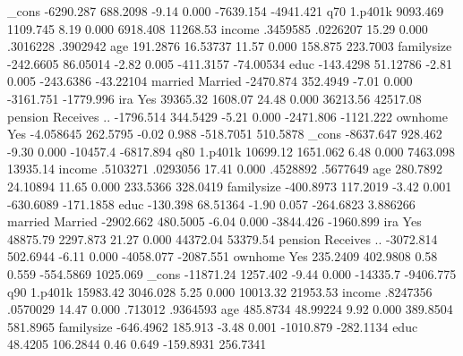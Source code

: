        _cons {\VBAR}  -6290.287   688.2098    -9.14   0.000    -7639.154   -4941.421
q70          {\VBAR}
     1.p401k {\VBAR}   9093.469   1109.745     8.19   0.000     6918.408    11268.53
      income {\VBAR}   .3459585   .0226207    15.29   0.000     .3016228    .3902942
         age {\VBAR}   191.2876   16.53737    11.57   0.000      158.875    223.7003
  familysize {\VBAR}  -242.6605   86.05014    -2.82   0.005    -411.3157   -74.00534
        educ {\VBAR}  -143.4298   51.12786    -2.81   0.005    -243.6386   -43.22104
             {\VBAR}
     married {\VBAR}
    Married  {\VBAR}  -2470.874   352.4949    -7.01   0.000    -3161.751   -1779.996
             {\VBAR}
         ira {\VBAR}
        Yes  {\VBAR}   39365.32    1608.07    24.48   0.000     36213.56    42517.08
             {\VBAR}
     pension {\VBAR}
Receives ..  {\VBAR}  -1796.514   344.5429    -5.21   0.000    -2471.806   -1121.222
             {\VBAR}
     ownhome {\VBAR}
        Yes  {\VBAR}  -4.058645   262.5795    -0.02   0.988    -518.7051    510.5878
       _cons {\VBAR}  -8637.647    928.462    -9.30   0.000     -10457.4   -6817.894
q80          {\VBAR}
     1.p401k {\VBAR}   10699.12   1651.062     6.48   0.000     7463.098    13935.14
      income {\VBAR}   .5103271   .0293056    17.41   0.000     .4528892    .5677649
         age {\VBAR}   280.7892   24.10894    11.65   0.000     233.5366    328.0419
  familysize {\VBAR}  -400.8973   117.2019    -3.42   0.001    -630.6089   -171.1858
        educ {\VBAR}   -130.398   68.51364    -1.90   0.057    -264.6823    3.886266
             {\VBAR}
     married {\VBAR}
    Married  {\VBAR}  -2902.662   480.5005    -6.04   0.000    -3844.426   -1960.899
             {\VBAR}
         ira {\VBAR}
        Yes  {\VBAR}   48875.79   2297.873    21.27   0.000     44372.04    53379.54
             {\VBAR}
     pension {\VBAR}
Receives ..  {\VBAR}  -3072.814   502.6944    -6.11   0.000    -4058.077   -2087.551
             {\VBAR}
     ownhome {\VBAR}
        Yes  {\VBAR}   235.2409   402.9808     0.58   0.559    -554.5869    1025.069
       _cons {\VBAR}  -11871.24   1257.402    -9.44   0.000     -14335.7   -9406.775
q90          {\VBAR}
     1.p401k {\VBAR}   15983.42   3046.028     5.25   0.000     10013.32    21953.53
      income {\VBAR}   .8247356   .0570029    14.47   0.000      .713012    .9364593
         age {\VBAR}   485.8734   48.99224     9.92   0.000     389.8504    581.8965
  familysize {\VBAR}  -646.4962    185.913    -3.48   0.001    -1010.879   -282.1134
        educ {\VBAR}    48.4205   106.2844     0.46   0.649    -159.8931    256.7341
